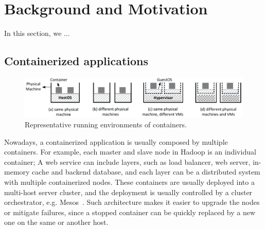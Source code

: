 \section{Background and Motivation}
\label{sec:motivation}

In this section, we ...

\subsection{Containerized applications}

\begin{figure}[h]  
	\centering   
	\includegraphics[width=6.7in]{figures/deployment-cases}   
	\caption{\label{fig:deploy-cases} Representative running environments of containers.}   
\end{figure}


Nowadays, a containerized application is usually composed by multiple containers. For example, each master and slave node in Hadoop is an individual container; A web service can include layers, such as load balancer, web server,
in-memory cache and backend database, and each layer can be a distributed 
system with multiple containerized nodes. 
These containers are usually 
deployed into a multi-host server cluster, and the deployment is usually 
controlled by a cluster orchestrator, e.g. Mesos~\cite{?}. 
Such architecture makes it easier
to upgrade the nodes or mitigate failures, since a stopped container can be quickly replaced by a new one on the same or another host.

